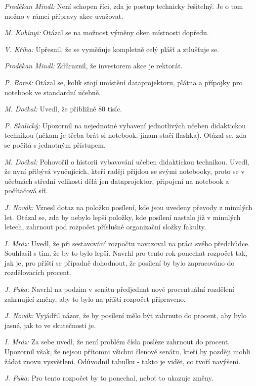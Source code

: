 \documentclass[a4paper,12pt,notitlepage,oneside]{article}
\begin{document}
\textit{Proděkan Mindl:} Není schopen říci, zda je postup technicky řešitelný. Je o tom možno v rámci přípravy akce uvažovat.

\textit{M. Kubínyi:} Otázal se na možnost výměny oken místnosti dopředu.

\textit{V. Kříha:} Upřesnil, že se vyměňuje kompletně celý plášť a ztlušťuje se.

\textit{Proděkan Mindl:} Zdůraznil, že investorem akce je rektorát.

\textit{P. Boreš:} Otázal se, kolik stojí umístění dataprojektoru, plátna a přípojky pro notebook ve standardní učebně.

\textit{M. Dočkal:} Uvedl, že přibližně 80 tisíc.

\textit{P. Skalický:} Upozornil na nejednotné vybavení jednotlivých učeben didaktickou technikou (někam je třeba brát si notebook, jinam stačí flashka). Otázal se, zda se počítá s jednotným přístupem.

\textit{M. Dočkal:} Pohovořil o historii vybavování učeben didaktickou technikou. Uvedl, že nyní přibývá vyučujících, kteří raději přijdou se svými notebooky, proto se v učebnách střední velikosti dělá jen dataprojektor, připojení na notebook a počítačová síť.

\textit{J. Novák:} Vznesl dotaz na položku posílení, kde jsou uvedeny převody z minulých let. Otázal se, zda by nebylo lepší položky, kde posílení nastalo již v minulých letech, zahrnout pod rozpočet příslušné organizační složky fakulty.

\textit{I. Mráz:} Uvedl, že při sestavování rozpočtu navazoval na práci svého předchůdce. Souhlasil s tím, že by to bylo lepší. Navrhl pro tento rok ponechat rozpočet tak, jak je, pro příští se případně dohodnout, že posílení by bylo zapracováno do rozdělovacích procent.

\textit{J. Fuka:} Navrhl na podzim v senátu předjednat nové procentuální rozdělení zahrnující změny, aby to bylo na příští rozpočet připraveno.

\textit{J. Novák:} Vyjádřil názor, že by posílení mělo být zahrnuto do procent, aby bylo jasné, jak to ve skutečnosti je.

\textit{I. Mráz:} Za sebe uvedl, že není problém čísla posléze zahrnout do procent. Upozornil však, že nejsou přítomni všichni členové senátu, kteří by později mohli žádat znovu vysvětlení. Odůvodnil tabulku - takto je vidět, co tvoří navýšení.

\textit{J. Fuka:} Pro tento rozpočet by to ponechal, neboť to ukazuje změny.
\end{document}

